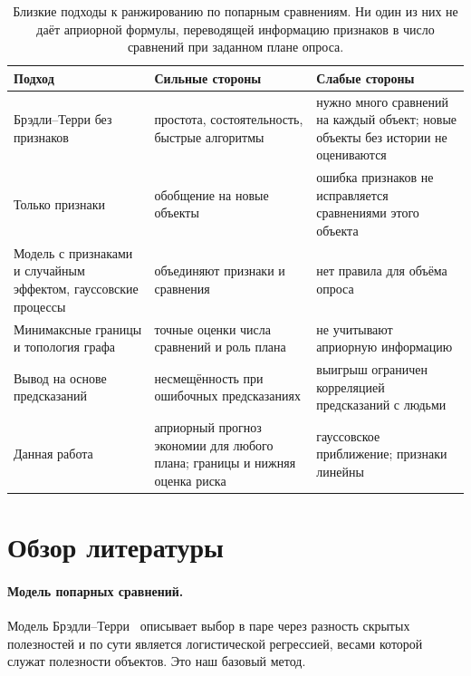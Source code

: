 \documentclass{article}
\theoremstyle{definition}
\theoremstyle{remark}
\begin{document}
\begin{table}[t]
\caption{Близкие подходы к ранжированию по попарным сравнениям. Ни один из них не даёт априорной формулы, переводящей информацию признаков в число сравнений при заданном плане опроса.}
\label{tab:related}
\centering\small
\begin{tabularx}{\linewidth}{>{\raggedright\arraybackslash}p{3.6cm} >{\raggedright\arraybackslash}X >{\raggedright\arraybackslash}X}
\toprule
Подход & Сильные стороны & Слабые стороны \\
\midrule
Брэдли--Терри без признаков~\citep{bradley1952rank} & простота, состоятельность, быстрые алгоритмы & нужно много сравнений на каждый объект; новые объекты без истории не оцениваются \\
Только признаки & обобщение на новые объекты & ошибка признаков не исправляется сравнениями этого объекта \\
Модель с признаками и случайным эффектом, гауссовские процессы~\citep{turner2012bradleyterry2, chu2005preference} & объединяют признаки и сравнения & нет правила для объёма опроса \\
Минимаксные границы и топология графа~\citep{shah2016estimation} & точные оценки числа сравнений и роль плана & не учитывают априорную информацию \\
Вывод на основе предсказаний~\citep{angelopoulos2023prediction, chatzi2024prediction} & несмещённость при ошибочных предсказаниях & выигрыш ограничен корреляцией предсказаний с людьми \\
\midrule
Данная работа & априорный прогноз экономии для любого плана; границы и нижняя оценка риска & гауссовское приближение; признаки линейны \\
\bottomrule
\end{tabularx}
\end{table}

\section{Обзор литературы}
\label{sec:review}

\paragraph{Модель попарных сравнений.}
Модель Брэдли--Терри~\citep{bradley1952rank} описывает выбор в паре через разность скрытых полезностей и по сути является логистической регрессией, весами которой служат полезности объектов. Это наш базовый метод.
\end{document}
